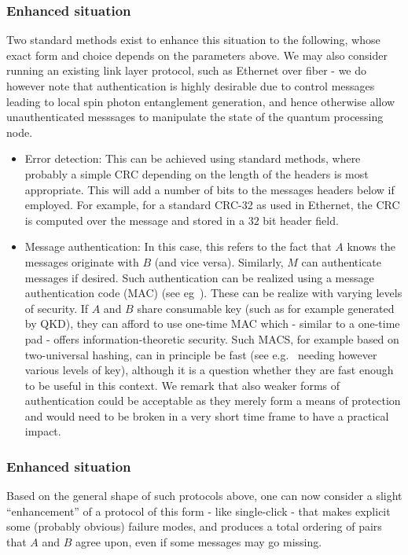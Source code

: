 \documentclass{article}
\begin{document}
\subsubsection{Enhanced situation}
Two standard methods exist to enhance this situation to the following, whose exact form and choice depends on the parameters above. We may also 
consider running an existing link layer protocol, such as Ethernet over fiber - we do however note that authentication is highly desirable due
to control messages leading to local spin photon entanglement generation, and hence otherwise allow unauthenticated messsages to manipulate the 
state of the quantum processing node.
\begin{itemize}
\item Error detection: This can be achieved using standard methods, where probably a simple CRC depending on the length of the headers is most appropriate. This will add a number of bits to the messages headers below if employed. For example, for a standard CRC-32 as used in Ethernet, the CRC is computed over the message and stored in a $32$ bit header field.
\item Message authentication: In this case, this refers to the fact that $A$ knows the messages originate with $B$ (and vice versa). 
Similarly, $M$ can authenticate messages if desired. Such authentication can be realized using a message authentication code (MAC) (see eg~\cite{UMAC}). These can be realize with varying levels of security. If $A$ and $B$ share consumable key (such as for example generated by QKD), they can afford to use one-time MAC which - similar to a one-time pad - offers information-theoretic security. Such MACS, for example based on two-universal hashing,  can in principle be fast (see e.g.~\cite{UMAC} needing however various levels of key), although it is a question whether they are fast enough to be useful in this context. We remark that also weaker forms of authentication could be acceptable as they merely form a means of protection and would need to be broken in a very short time frame to have a practical impact.
\end{itemize}

\subsubsection{Enhanced situation}

Based on the general shape of such protocols above, one can now consider a slight ``enhancement'' of a protocol of this form - like single-click - 
that makes explicit some (probably obvious) failure modes, and produces a total ordering of pairs that $A$ and $B$ agree upon, even if some messages may go missing.
\end{document}
